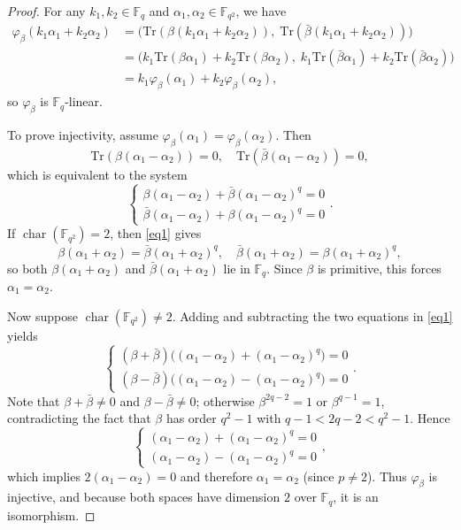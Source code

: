 \documentclass[10pt,a4paper]{amsart}
\newcommand{\F}{\mathbb{F}}
\newcommand{\Tr}{\mathrm{Tr}}
\newcommand{\charac}{\operatorname{char}}
\begin{document}
\begin{proof}
	For any $k_1, k_2 \in \F_q$ and $\alpha_1, \alpha_2 \in \F_{q^2}$, we have
	\[
	\begin{aligned}
		\varphi_\beta(k_1\alpha_1 + k_2\alpha_2)
		&= \bigl( \Tr(\beta(k_1\alpha_1 + k_2\alpha_2)),\; \Tr(\bar{\beta}(k_1\alpha_1 + k_2\alpha_2)) \bigr) \\
		&= \bigl( k_1\Tr(\beta\alpha_1) + k_2\Tr(\beta\alpha_2),\; k_1\Tr(\bar{\beta}\alpha_1) + k_2\Tr(\bar{\beta}\alpha_2) \bigr) \\
		&= k_1\varphi_\beta(\alpha_1) + k_2\varphi_\beta(\alpha_2),
	\end{aligned}
	\]
	so $\varphi_\beta$ is $\F_q$-linear.
	
	To prove injectivity, assume $\varphi_\beta(\alpha_1) = \varphi_\beta(\alpha_2)$. Then
	\[
	\Tr(\beta(\alpha_1 - \alpha_2)) = 0, \quad\Tr(\bar{\beta}(\alpha_1-\alpha_2)) = 0,
	\]
	which is equivalent to the system
	\begin{equation}\label{eq1}
		\begin{cases}
		\beta(\alpha_1 - \alpha_2) + \bar{\beta}(\alpha_1 - \alpha_2)^q = 0\\
		\bar{\beta}(\alpha_1 - \alpha_2) + \beta(\alpha_1 - \alpha_2)^q = 0
	\end{cases}.
	\end{equation}
	If $\charac(\F_{q^2}) = 2$, then \eqref{eq1} gives
	\[
	\beta(\alpha_1 + \alpha_2) = \bar{\beta}(\alpha_1 + \alpha_2)^q,\quad 
	\bar{\beta}(\alpha_1 + \alpha_2) = \beta(\alpha_1 + \alpha_2)^q,
	\]
	so both $\beta(\alpha_1 + \alpha_2)$ and $\bar{\beta}(\alpha_1 + \alpha_2)$ lie in $\F_q$. Since $\beta$ is primitive, this forces $\alpha_1 = \alpha_2$.
	
	Now suppose $\charac(\F_{q^2}) \neq 2$. Adding and subtracting the two equations in \eqref{eq1} yields
	\[
	\begin{cases}
		(\beta + \bar{\beta})\bigl((\alpha_1 - \alpha_2) + (\alpha_1 - \alpha_2)^q\bigr) = 0\\
		(\beta - \bar{\beta})\bigl((\alpha_1 - \alpha_2) - (\alpha_1 - \alpha_2)^q\bigr) = 0
	\end{cases}.
	\]
	Note that $\beta + \bar{\beta} \neq 0$ and $\beta - \bar{\beta} \neq 0$; otherwise $\beta^{2q-2}=1$ or $\beta^{q-1}=1$, contradicting the fact that $\beta$ has order $q^2-1$ with $q-1 < 2q-2 < q^2-1$. Hence
	\[
	\begin{cases}
		(\alpha_1 - \alpha_2) + (\alpha_1 - \alpha_2)^q = 0\\
		(\alpha_1 - \alpha_2) - (\alpha_1 - \alpha_2)^q = 0
	\end{cases},
	\]
	which implies $2(\alpha_1 - \alpha_2) = 0$ and therefore $\alpha_1 = \alpha_2$ (since $p \neq 2$). Thus $\varphi_\beta$ is injective, and because both spaces have dimension $2$ over $\F_q$, it is an isomorphism.
\end{proof}
\end{document}
